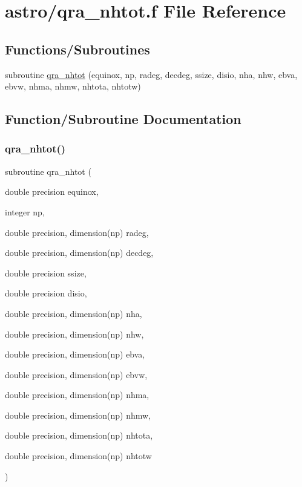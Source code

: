 \hypertarget{qra__nhtot_8f}{}\section{astro/qra\+\_\+nhtot.f File Reference}
\label{qra__nhtot_8f}
\subsection*{Functions/\+Subroutines}
\begin{DoxyCompactItemize}
\item 
subroutine \hyperlink{qra__nhtot_8f_a84ea7b2a909364be4b38259bf8f3e1ed}{qra\+\_\+nhtot} (equinox, np, radeg, decdeg, ssize, disio, nha, nhw, ebva, ebvw, nhma, nhmw, nhtota, nhtotw)
\end{DoxyCompactItemize}


\subsection{Function/\+Subroutine Documentation}
\mbox{\label{qra__nhtot_8f_a84ea7b2a909364be4b38259bf8f3e1ed}} 
\subsubsection{\texorpdfstring{qra\+\_\+nhtot()}{qra\_nhtot()}}
{\footnotesize\ttfamily subroutine qra\+\_\+nhtot (\begin{DoxyParamCaption}\item[{double precision}]{equinox,  }\item[{integer}]{np,  }\item[{double precision, dimension(np)}]{radeg,  }\item[{double precision, dimension(np)}]{decdeg,  }\item[{double precision}]{ssize,  }\item[{double precision}]{disio,  }\item[{double precision, dimension(np)}]{nha,  }\item[{double precision, dimension(np)}]{nhw,  }\item[{double precision, dimension(np)}]{ebva,  }\item[{double precision, dimension(np)}]{ebvw,  }\item[{double precision, dimension(np)}]{nhma,  }\item[{double precision, dimension(np)}]{nhmw,  }\item[{double precision, dimension(np)}]{nhtota,  }\item[{double precision, dimension(np)}]{nhtotw }\end{DoxyParamCaption})}

